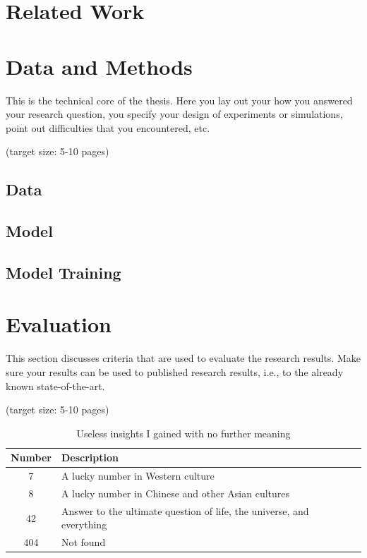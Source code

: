 \documentclass[a4paper,11pt,oneside]{article}
\begin{document}
  \section{Related Work}


  \section{Data and Methods}

  This is the technical core of the thesis. Here you lay out your how
  you answered your research question, you specify your design of
  experiments or simulations, point out difficulties that you
  encountered, etc.

  (target size: 5-10 pages)

  \subsection{Data}
  \subsection{Model}
  \subsection{Model Training}

  \section{Evaluation}

  This section discusses criteria that are used to evaluate the
  research results. Make sure your results can be used to published
  research results, i.e., to the already known state-of-the-art.

  (target size: 5-10 pages)

  \begin{table}[ht]
    \begin{center}
      \begin{tabular}{cl}
        \toprule
        Number & Description \\
        \midrule
        7 & A lucky number in Western culture \\
        8 & A lucky number in Chinese and other Asian cultures \\
        42 & Answer to the ultimate question of life, the universe, and everything \\
        404 & Not found \\
        \bottomrule
      \end{tabular}
      \caption{Useless insights I gained with no further meaning}
    \end{center}
  \end{table}
\end{document}
